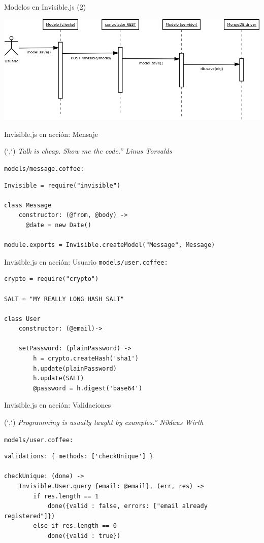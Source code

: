 \documentclass[xcolor=dvipsnames, 14pt]{beamer}
\newenvironment{reference}[2]{%
  \begin{textblock*}{\textwidth}(#1,#2)
      \footnotesize\it\bgroup\color{gray!50!black}}{\egroup\end{textblock*}}
\begin{document}
\begin{frame}{Modelos en Invisible.js (2)}
    \begin{center}
        \includegraphics[width=\textwidth]{img/secuencia.png}
    \end{center}
\end{frame}

\begin{frame}[fragile]{Invisible.js en acción: Mensaje}
\begin{reference}{4mm}{13mm}
``Talk is cheap. Show me the code.'' Linus Torvalds
\end{reference}

\texttt{models/message.coffee:}
\begin{lstlisting}
Invisible = require("invisible")

class Message
    constructor: (@from, @body) ->
      @date = new Date()

module.exports = Invisible.createModel("Message", Message)
\end{lstlisting}

\end{frame}

\begin{frame}[fragile]{Invisible.js en acción: Usuario}
\texttt{models/user.coffee:}
\begin{lstlisting}
crypto = require("crypto")

SALT = "MY REALLY LONG HASH SALT"

class User
    constructor: (@email)->

    setPassword: (plainPassword) ->
        h = crypto.createHash('sha1')
        h.update(plainPassword)
        h.update(SALT)
        @password = h.digest('base64')
\end{lstlisting}
\end{frame}

\begin{frame}[fragile]{Invisible.js en acción: Validaciones}
\begin{reference}{4mm}{13mm}
``Programming is usually taught by examples.'' Niklaus Wirth
\end{reference}

\texttt{models/user.coffee:}
\begin{lstlisting}
validations: { methods: ['checkUnique'] }

checkUnique: (done) ->
    Invisible.User.query {email: @email}, (err, res) ->
        if res.length == 1
            done({valid : false, errors: ["email already registered"]})
        else if res.length == 0
            done({valid : true})
\end{lstlisting}
\end{frame}
\end{document}
